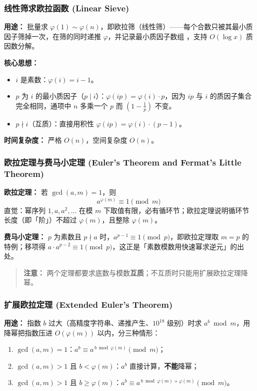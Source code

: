 \subsubsection{线性筛求欧拉函数 (Linear Sieve)}

\textbf{用途：}
批量求 $\varphi(1) \sim \varphi(n)$，即欧拉筛（线性筛）——每个合数只被其最小质因子筛掉一次，在筛的同时递推 $\varphi$，并记录最小质因子数组 ，支持 $O(\log x)$ 质因数分解。

\textbf{核心思想：}
\begin{itemize}
    \item $i$ 是素数：$\varphi(i) = i - 1$。
    \item $p$ 为 $i$ 的最小质因子（$p \mid i$）：$\varphi(ip) = \varphi(i) \cdot p$，因为 $ip$ 与 $i$ 的质因子集合完全相同，通项中 $n$ 多乘一个 $p$ 而 $\left(1 - \frac{1}{p}\right)$ 不变。
    \item $p \nmid i$（互质）：直接用积性 $\varphi(ip) = \varphi(i) \cdot (p-1)$。
\end{itemize}

\textbf{时间复杂度：} 严格 $O(n)$，空间复杂度 $O(n)$。



\subsubsection{欧拉定理与费马小定理 (Euler's Theorem and Fermat's Little Theorem)}

\textbf{欧拉定理：} 若 $\gcd(a, m) = 1$，则
\[
a^{\varphi(m)} \equiv 1 \pmod{m}
\]
直觉：幂序列 $1, a, a^{2}, \dots$ 在模 $m$ 下取值有限，必有循环节；欧拉定理说明循环节长度（即「阶」）不超过 $\varphi(m)$，且整除 $\varphi(m)$。

\textbf{费马小定理：} $p$ 为素数且 $p \nmid a$ 时，$a^{p-1} \equiv 1 \pmod{p}$，即欧拉定理取 $m = p$ 的特例；移项得 $a \cdot a^{p-2} \equiv 1 \pmod{p}$，这正是「素数模数用快速幂求逆元」的出处。

\begin{quote}
\textbf{注意：} 两个定理都要求底数与模数\textbf{互质}；不互质时只能用扩展欧拉定理降幂。
\end{quote}

\subsubsection{扩展欧拉定理 (Extended Euler's Theorem)}

\textbf{用途：}
指数 $b$ 过大（高精度字符串、递推产生、$10^{18}$ 级别）时求 $a^{b} \bmod m$，用降幂把指数压进 $O(\varphi(m))$ 以内，分三种情形：
\begin{enumerate}
    \item $\gcd(a, m) = 1$：$a^{b} \equiv a^{\,b \bmod \varphi(m)} \pmod{m}$；
    \item $\gcd(a, m) > 1$ 且 $b < \varphi(m)$：$a^{b}$ 直接计算，\textbf{不能}降幂；
    \item $\gcd(a, m) > 1$ 且 $b \ge \varphi(m)$：$a^{b} \equiv a^{\,b \bmod \varphi(m) + \varphi(m)} \pmod{m}$。
\end{enumerate}

